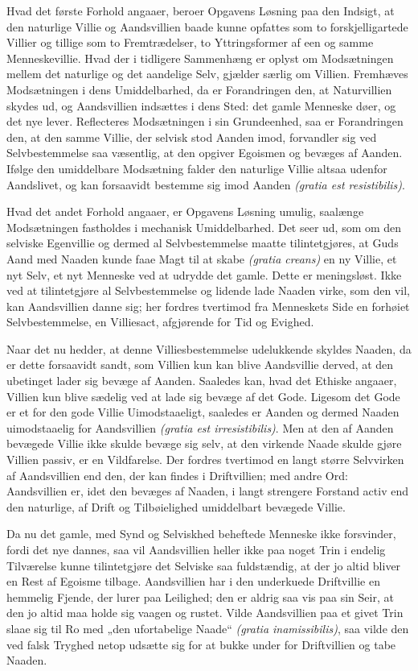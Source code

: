 \documentclass[12pt]{book}
\begin{document}
Hvad det første Forhold angaaer, beroer Opgavens Løsning paa den
Indsigt, at den naturlige Villie og Aandsvillien baade kunne
opfattes som to forskjelligartede Villier og tillige som to
Fremtrædelser, to Yttringsformer af een og samme Menneskevillie.
Hvad der i tidligere Sammenhæng er oplyst om Modsætningen mellem det
naturlige og det aandelige Selv, gjælder særlig om Villien.
Fremhæves Modsætningen i dens Umiddelbarhed, da er Forandringen den,
at Naturvillien skydes ud, og Aandsvillien indsættes i dens Sted:
det gamle Menneske døer, og det nye lever. Reflecteres Modsætningen
i sin Grundeenhed, saa er Forandringen den, at den samme Villie, der
selvisk stod Aanden imod, forvandler sig ved Selvbestemmelse saa
væsentlig, at den opgiver Egoismen og bevæges af Aanden. Ifølge den
umiddelbare Modsætning falder den naturlige Villie altsaa udenfor
Aandslivet, og kan forsaavidt bestemme sig imod Aanden
\textit{(gratia est resistibilis)}.

Hvad det andet Forhold angaaer, er Opgavens Løsning umulig,
saalænge Modsætningen fastholdes i mechanisk Umiddelbarhed. Det seer
ud, som om den selviske
Egenvillie og dermed al Selvbestemmelse maatte tilintetgjøres, at
Guds Aand med Naaden kunde faae Magt til at skabe \textit{(gratia
creans)} en ny Villie, et nyt Selv, et nyt Menneske ved at udrydde
det gamle. Dette er meningsløst. Ikke ved at tilintetgjøre al
Selvbestemmelse og lidende lade Naaden virke, som den vil, kan
Aandsvillien danne sig; her fordres tvertimod fra Menneskets Side en
forhøiet Selvbestemmelse, en Villiesact, afgjørende for Tid og
Evighed.

Naar det nu hedder, at denne Villiesbestemmelse udelukkende skyldes
Naaden, da er dette forsaavidt sandt, som Villien kun kan blive
Aandsvillie derved, at den ubetinget lader sig bevæge af Aanden.
Saaledes kan, hvad det Ethiske angaaer, Villien kun blive sædelig
ved at lade sig bevæge af det Gode. Ligesom det Gode er et for den
gode Villie Uimodstaaeligt, saaledes er Aanden og dermed Naaden
uimodstaaelig for Aandsvillien \textit{(gratia est irresistibilis)}.
Men at den af Aanden bevægede Villie ikke skulde bevæge sig selv, at
den virkende Naade skulde gjøre Villien passiv, er en Vildfarelse.
Der fordres tvertimod en langt større Selvvirken af Aandsvillien end
den, der kan findes i Driftvillien; med andre Ord: Aandsvillien er,
idet den bevæges af Naaden, i langt strengere Forstand activ end den
naturlige, af Drift og Tilbøielighed umiddelbart bevægede Villie.

Da nu det gamle, med Synd og Selviskhed beheftede Menneske ikke
forsvinder, fordi det nye dannes, saa vil Aandsvillien heller ikke
paa noget Trin i endelig Tilværelse kunne tilintetgjøre det Selviske
saa fuldstændig, at der jo altid bliver en Rest af Egoisme tilbage.
Aandsvillien har i den underkuede Driftvillie en hemmelig Fjende,
der lurer paa Leilighed; den er aldrig saa vis paa sin Seir, at den
jo altid maa holde sig vaagen og rustet. Vilde Aandsvillien paa et
givet Trin slaae sig til Ro med „den ufortabelige Naade“
\textit{(gratia inamissibilis)}, saa vilde den ved
falsk Tryghed netop udsætte sig for at bukke under for Driftvillien
og tabe Naaden.
\end{document}
